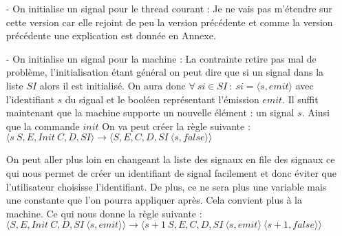 \documentclass[10pt,a4paper]{report}
\newtheorem{ex}{Exemple}
\begin{document}
\begin{itemize}
		Pour palier au troisième problème on peut réunir les informations de l'initialisation et de l'émission dans la liste des signaux. Cependant on va devoir ajouter une façon d'identifier les threads. Voyons cela avec un exemple.
		\smallbreak
		\begin{ex}
			On crée deux threads que l'on va nommer, que l'on va nommer avec beaucoup d'imagination, $t1$ et $t2$.
			\smallbreak
			$t1$ initialise un signal $s$ et va être bloquer par l'attente d'une émission. $t2$ lui va initialiser le signal $s$ aussi. Un problème survient si on ne vérifie qui à initialisé on peut voir la seconde intialisation qui est dans un autre thread comme un problème car le signal est déjà théoriquement initialisé. 
		\end{ex}
		\medbreak
		
		Avec cette forme et la contrainte du champs d'action la résolution du problème est compliqué. On ne va pas prendre cette possibilité dans la machine mais cela vous intéresse je mets en Annexe les explications pour pouvoir créer une règle qui fonctionne avec ces contraintes.
		\bigbreak
		
		\item[-] On initialise un signal pour le thread courant : Je ne vais pas m'étendre sur cette version car elle rejoint de peu la version précédente et comme la version précédente une explication est donnée en Annexe.
		\bigbreak
		
		
		\item[-] On initialise un signal pour la machine : La contrainte retire pas mal de problème, l'initialisation étant général on peut dire que si un signal dans la liste $SI$ alors il est initialisé. On aura donc $\forall~si \in SI~:~si = \langle s,emit\rangle$ avec l'identifiant $s$ du signal et le booléen représentant l'émission $emit$. Il suffit maintenant que la machine supporte un nouvelle élément : un signal $s$. Ainsi que la commande $init$ On va peut créer la règle suivante : 
		\smallbreak
		$\langle s~S,E,Init~C,D,SI\rangle \longrightarrow \langle S,E,C,D,SI~\langle s,false\rangle \rangle$ 
		\medbreak
		
		On peut aller plus loin en changeant la liste des signaux en file des signaux ce qui nous permet de créer un identifiant de signal facilement et donc éviter que l'utilisateur choisisse l'identifiant. De plus, ce ne sera plus une variable mais une constante que l'on pourra appliquer après. Cela convient plus à la machine. Ce qui nous donne la règle suivante :
		\smallbreak
		$\langle S,E,Init~C,D,SI~\langle s,emit\rangle\rangle \longrightarrow \langle s+1~S,E,C,D,SI~\langle s,emit\rangle ~\langle s+1,false\rangle \rangle$ 
	\end{itemize}
	\bigbreak
	
\end{document}
